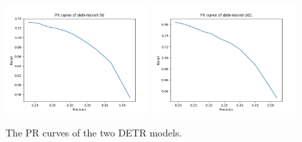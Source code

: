 \clearpage

\begin{figure}[h]
    \captionsetup{width=\textwidth}
    \includegraphics[width=0.49\textwidth]{figures/detr-resnet-50.png}
    \includegraphics[width=0.49\textwidth]{figures/detr-resnet-101.png}
    \caption{The PR curves of the two DETR models.}
    \label{fig:pr_detr}
\end{figure}


